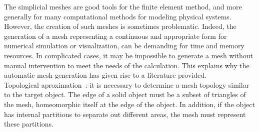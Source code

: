 The simplicial meshes are good tools for the finite element method, and more generally for many computational methods for modeling physical systems. However, the creation of such meshes is sometimes problematic. Indeed, the generation of a mesh representing a continuous and appropriate form for numerical simulation or visualization, can be demanding for time and memory resources. In complicated cases, it may be impossible to generate a mesh without manual intervention to meet the needs of the calculation. This explains why the automatic mesh generation has given rise to a literature provided.\\
Topological aproximation~: it is necessary to determine a mesh topology similar to the target object. The edge of a solid object must be a subset of triangles of the mesh, homeomorphic itself at the edge of the object. In addition, if the object has internal partitions to separate out different areas, the mesh must represent these partitions.\\

